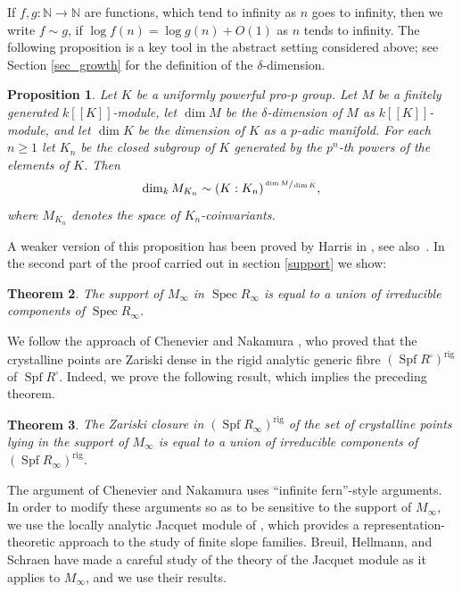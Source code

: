 \documentclass[JEP,XML,SOM,Unicode,NoEqCountersInSection]{cedram}
\newcommand{\ssquare}{{\scriptscriptstyle\square}}
\newtheorem{prop}{Proposition}[section]
\newtheorem{thm}[prop]{Theorem}
\theoremstyle{definition}
\DeclareMathOperator{\Spf}{Spf}
\DeclareMathOperator{\Spec}{Spec}
\newcommand{\br}[1]{[\![#1]\!]}
\newcommand\rig{\mathrm{rig}}
\begin{document}
If $f, g:\mathbb N\to \mathbb N$ are functions, which tend to infinity as $n$ goes to infinity, then we write $f\sim g$, if $\log f(n)=\log g(n) + O(1)$ as $n$ tends to infinity.
The following proposition is a key tool in the abstract setting considered above; see Section \ref{sec_growth} for the definition of the $\delta$-dimension.

\begin{prop}\label{growth_intro} Let $K$ be a uniformly powerful pro-$p$ group. Let $M$ be a
finitely generated $k\br{K}$-module, let $\dim M$ be the $\delta$-dimension of $M$ as $k\br{K}$-module, and let $\dim K$ be the dimension of $K$ as a $p$-adic manifold. For each $n\ge1$ let $K_n$ be the closed subgroup of $K$ generated by the $p^n$-th powers of the elements of $K$. Then
\[
\dim_k M_{K_n}\sim (K:K_n)^{\sfrac{\dim M}{\dim K}},
\]
where $M_{K_n}$ denotes the space of $K_n$-coinvariants.
\end{prop}

A weaker version of this proposition has been proved by Harris in \cite{harris}, see also~\cite{harris_err}. In the second part of the proof carried out in section
\ref{support} we show:

\begin{thm}\label{B} The support of $M_{\infty}$ in $\Spec R_{\infty}$
is equal to a union of irreducible components of $\Spec R_{\infty}$.
\end{thm}

We follow the approach of Chenevier \cite{Chenevier}
and Nakamura \cite{Nakamura}, who proved that
the crystalline points are Zariski dense in the rigid analytic generic
fibre $(\Spf R^\ssquare)^{\rig}$
of $\Spf R^\ssquare$. Indeed, we prove the following result,
which implies the preceding theorem.

\begin{thm}\label{C} The Zariski closure in $(\Spf R_{\infty})^{\rig}$
of the set of crystalline points lying in the support of $M_{\infty}$
is equal to
a union of irreducible components of $(\Spf R_{\infty})^{\rig}$.
\end{thm}

The argument of Chenevier and Nakamura uses ``infinite fern''-style
arguments. In order to modify these arguments so as to be sensitive
to the support of $M_{\infty}$, we use the locally analytic Jacquet
module of \cite{Jacquet-one}, which provides a representation-theoretic
approach to the study of finite slope families. Breuil, Hellmann,
and Schraen \cite{BHS} have made a careful study of the theory
of the Jacquet module as it applies to $M_{\infty}$, and we use
their results.
\end{document}
